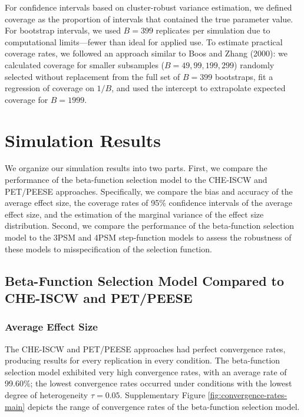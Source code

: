 \documentclass[
  american,
  man, donotrepeattitle,floatsintext]{apa7}
\begin{document}
For confidence intervals based on cluster-robust variance estimation, we defined coverage as the proportion of intervals that contained the true parameter value. For bootstrap intervals, we used \(B = 399\) replicates per simulation due to computational limits---fewer than ideal for applied use. To estimate practical coverage rates, we followed an approach similar to Boos and Zhang (2000): we calculated coverage for smaller subsamples (\(B = 49, 99, 199, 299\)) randomly selected without replacement from the full set of \(B = 399\) bootstraps, fit a regression of coverage on \(1/B\), and used the intercept to extrapolate expected coverage for \(B = 1999\).

\section{Simulation Results}\label{simulation-results}

We organize our simulation results into two parts. First, we compare the performance of the beta-function selection model to the CHE-ISCW and PET/PEESE approaches. Specifically, we compare the bias and accuracy of the average effect size, the coverage rates of 95\% confidence intervals of the average effect size, and the estimation of the marginal variance of the effect size distribution. Second, we compare the performance of the beta-function selection model to the 3PSM and 4PSM step-function models to assess the robustness of these models to misspecification of the selection function.

\subsection{Beta-Function Selection Model Compared to CHE-ISCW and PET/PEESE}\label{beta-function-selection-model-compared-to-che-iscw-and-petpeese}

\subsubsection{Average Effect Size}\label{average-effect-size}

The CHE-ISCW and PET/PEESE approaches had perfect convergence rates, producing results for every replication in every condition. The beta-function selection model exhibited very high convergence rates, with an average rate of 99.60\%; the lowest convergence rates occurred under conditions with the lowest degree of heterogeneity \(\tau = 0.05\). Supplementary Figure \ref{fig:convergence-rates-main} depicts the range of convergence rates of the beta-function selection model.
\end{document}
